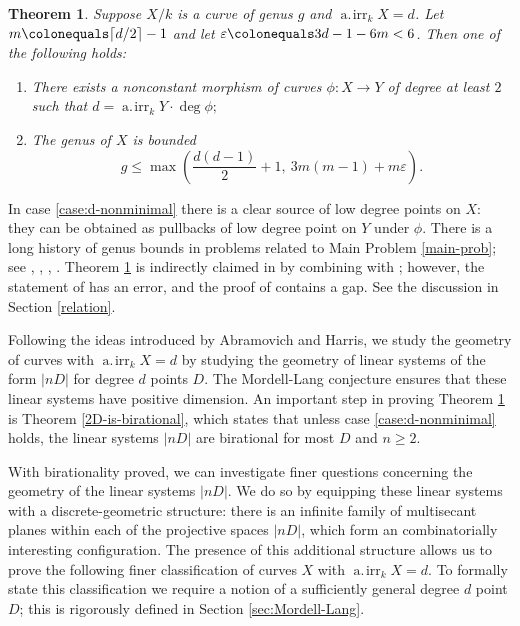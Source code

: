 \documentclass[11pt]{amsart}
\newcommand{\airr}{\operatorname{a.\!irr}}
\newtheorem{theorem}{Theorem}[section]
\theoremstyle{definition}
\theoremstyle{remark}
\begin{document}
\begin{theorem}\label{genus-bound}
Suppose $X/k$ is a curve of genus $g$ and $\airr_k X= d$. Let $m \colonequals \lceil d/2\rceil -1$ and let $\varepsilon \colonequals 3d-1-6m<6$. Then one of the following holds:
\begin{enumerate}
    \item\label{case:d-nonminimal} There exists a nonconstant morphism of curves $\phi\colon X \to Y$ of degree at least $2$ such that $d  =\airr_k Y \cdot \deg \phi ;$
   \item\label{eq-genus-bound} The genus of $X$ is bounded \[g \leqslant \max \left(\frac{d(d-1)}{2}+1,\ 3m(m-1)+m\varepsilon \right).\]
\end{enumerate} 
\end{theorem}

In case \eqref{case:d-nonminimal} there is a clear source of low degree points on $X$: they can be obtained as pullbacks of low degree point on $Y$ under $\phi$.  There is a long history of genus bounds in problems related to Main Problem \ref{main-prob}; see  \cite{Vojta1991quadratic},  \cite{Vojta1992generalization},  \cite{Abramovich-Harris1991}, \cite{song-tucker2001}.  Theorem \ref{genus-bound} is indirectly claimed in \cite{Abramovich-Harris1991} by combining  \cite[Lemma 3]{Abramovich-Harris1991} with \cite[Theorem 2]{Abramovich-Harris1991}; however, the statement of \cite[Lemma 3]{Abramovich-Harris1991} has an error, and the proof of \cite[Theorem 2]{Abramovich-Harris1991} contains a gap. See the discussion in Section \ref{relation}.

Following the ideas introduced by Abramovich and Harris, we study the geometry of curves with $\airr_k X = d$ by studying the geometry of linear systems of the form $|nD|$ for degree \(d\) points \(D\). The Mordell-Lang conjecture ensures that these linear systems have positive dimension. An important step in proving Theorem \ref{genus-bound} is Theorem \ref{2D-is-birational}, which states that unless case \eqref{case:d-nonminimal} holds, the linear systems $|nD|$ are birational for most $D$ and $n \geqslant 2$.

With birationality proved, we can investigate finer questions concerning the geometry of the linear systems $|nD|$. We do so by equipping these linear systems with a discrete-geometric structure: there is an infinite family of multisecant planes within each of the projective spaces $|nD|$, which form an combinatorially interesting configuration. The presence of this additional structure allows us to prove the following finer classification of curves \(X\) with \(\airr_kX = d\). To formally state this classification we require a notion of a sufficiently general degree $d$ point $D$; this is rigorously defined in Section \ref{sec:Mordell-Lang}. 
\end{document}
